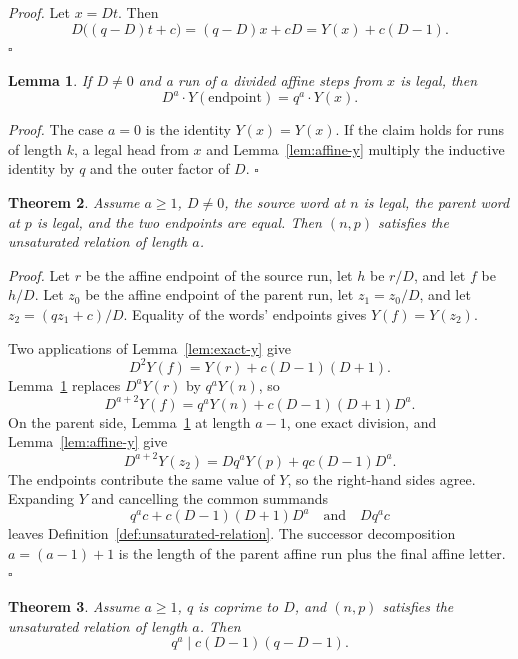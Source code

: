 \documentclass[11pt,letterpaper]{article}
\newtheorem{theorem}{Theorem}
\newtheorem{lemma}[theorem]{Lemma}
\newenvironment{proof}{\noindent\textit{Proof.}}{\hfill\(\square\)}
\begin{document}
\begin{proof}
Let \(x=Dt\). Then
\[
D\bigl((q-D)t+c\bigr)=(q-D)x+cD=Y(x)+c(D-1).
\]
\end{proof}

\begin{lemma}
\label{lem:run-y}
If \(D\neq 0\) and a run of \(a\) divided affine steps from \(x\) is legal, then
\[
D^a\cdot Y(\text{endpoint})=q^a\cdot Y(x).
\]
\end{lemma}

\begin{proof}
The case \(a=0\) is the identity \(Y(x)=Y(x)\). If the claim holds for runs of length \(k\), a legal head from \(x\) and Lemma~\ref{lem:affine-y} multiply the inductive identity by \(q\) and the outer factor of \(D\).
\end{proof}

\begin{theorem}
\label{thm:word-relation}
Assume \(a\ge 1\), \(D\neq 0\), the source word at \(n\) is legal, the parent word at \(p\) is legal, and the two endpoints are equal. Then \((n,p)\) satisfies the unsaturated relation of length \(a\).
\end{theorem}

\begin{proof}
Let \(r\) be the affine endpoint of the source run, let \(h\) be \(r/D\), and let \(f\) be \(h/D\). Let \(z_0\) be the affine endpoint of the parent run, let \(z_1=z_0/D\), and let \(z_2=(qz_1+c)/D\). Equality of the words' endpoints gives \(Y(f)=Y(z_2)\).

Two applications of Lemma~\ref{lem:exact-y} give
\[
D^2 Y(f)=Y(r)+c(D-1)(D+1).
\]
Lemma~\ref{lem:run-y} replaces \(D^a Y(r)\) by \(q^a Y(n)\), so
\[
D^{a+2}Y(f)=q^a Y(n)+c(D-1)(D+1)D^a.
\]
On the parent side, Lemma~\ref{lem:run-y} at length \(a-1\), one exact division, and Lemma~\ref{lem:affine-y} give
\[
D^{a+2}Y(z_2)=Dq^a Y(p)+qc(D-1)D^a.
\]
The endpoints contribute the same value of \(Y\), so the right-hand sides agree. Expanding \(Y\) and cancelling the common summands
\[
q^a c+c(D-1)(D+1)D^a
\quad\text{and}\quad
Dq^a c
\]
leaves Definition~\ref{def:unsaturated-relation}. The successor decomposition \(a=(a-1)+1\) is the length of the parent affine run plus the final affine letter.
\end{proof}

\begin{theorem}
\label{thm:divisibility}
Assume \(a\ge 1\), \(q\) is coprime to \(D\), and \((n,p)\) satisfies the unsaturated relation of length \(a\). Then
\[
q^a\mid c(D-1)(q-D-1).
\]
\end{theorem}
\end{document}
